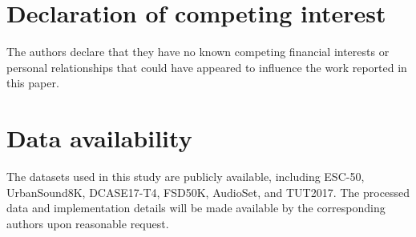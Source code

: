 \documentclass[final,5p,times,twocolumn]{elsarticle}
\begin{document}
\section*{Declaration of competing interest}
The authors declare that they have no known competing financial interests or personal relationships that could have appeared to influence the work reported in this paper.

\section*{Data availability}
The datasets used in this study are publicly available, including ESC-50, UrbanSound8K, DCASE17-T4, FSD50K, AudioSet, and TUT2017. The processed data and implementation details will be made available by the corresponding authors upon reasonable request.

\begingroup
\fontsize{9}{10.5}\selectfont
\setlength{\bibsep}{0pt}


\endgroup

\appendix

\end{document}
